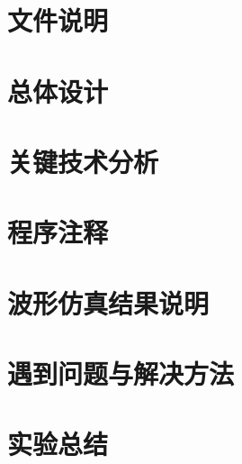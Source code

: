 \documentclass[12pt]{article}
\begin{document}
\section{文件说明}
\section{总体设计}
\section{关键技术分析}
\section{程序注释}
\section{波形仿真结果说明}
\section{遇到问题与解决方法}
\section{实验总结}
\end{document}
